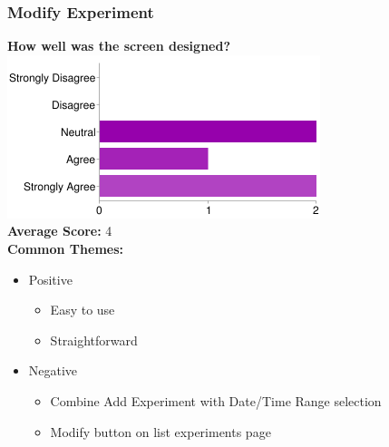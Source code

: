 \subsubsection{Modify Experiment}
\textbf{How well was the screen designed?}\\
\includegraphics[page=1,scale=0.65]{../other/usability-report-charts/modify_experiment_bar_chart}\\
\textbf{Average Score:} 4\\
\textbf{Common Themes:}
\begin{itemize}
\item Positive
\begin{itemize}
\item Easy to use
\item Straightforward
\end{itemize}
\item Negative
\begin{itemize}
\item Combine Add Experiment with Date/Time Range selection
\item Modify button on list experiments page
\end{itemize}
\end{itemize}

